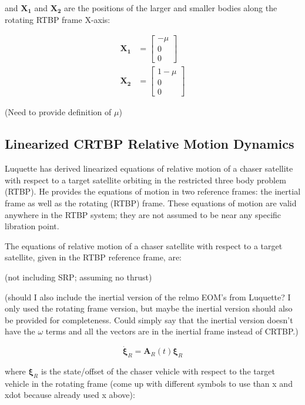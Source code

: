 \documentclass[]{article}
\begin{document}
and \(\mathbf{X_1}\) and \(\mathbf{X_2}\) are the positions of the larger and smaller bodies along the rotating RTBP frame X-axis:

\begin{equation*}
\begin{aligned}
\mathbf{X_1} &= \begin{bmatrix}
						-\mu \\ 0 \\ 0 
						\end{bmatrix} \\
\mathbf{X_2} &= \begin{bmatrix}
						1 - \mu \\ 0 \\ 0
						\end{bmatrix}
\end{aligned}
\end{equation*}

(Need to provide definition of \(\mu\))

\subsection{Linearized CRTBP Relative Motion Dynamics}
Luquette has derived linearized equations of relative motion of a chaser satellite with respect to a target satellite orbiting in the restricted three body problem (RTBP).  He provides the equations of motion in two reference frames: the inertial frame as well as the rotating (RTBP) frame.  These equations of motion are valid anywhere in the RTBP system; they are not assumed to be near any specific libration point.

The equations of relative motion of a chaser satellite with respect to a target satellite, given in the RTBP reference frame, are:

(not including SRP; assuming no thrust)

(should I also include the inertial version of the relmo EOM's from Luquette?  I only used the rotating frame version, but maybe the inertial version should also be provided for completeness.  Could simply say that the inertial version doesn't have the \(\omega\) terms and all the vectors are in the inertial frame instead of CRTBP.)

\begin{equation} \label{eq:RelmoDerivs}
\dot{\boldsymbol{\xi}}_R = \mathbf{A}_R(t)\boldsymbol{\xi}_R
\end{equation}

where \(\boldsymbol{\xi}_R\) is the state/offset of the chaser vehicle with respect to the target vehicle in the rotating frame (come up with different symbols to use than x and xdot because already used x above):
\end{document}
